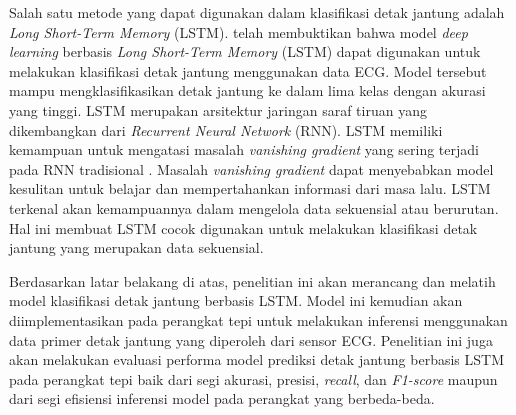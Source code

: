 

Salah satu metode yang dapat digunakan dalam klasifikasi detak jantung adalah \textit{Long Short-Term Memory} (LSTM).
\textcite{shchetininArrhythmiaDetectionUsing2022} telah membuktikan bahwa model \textit{deep learning} berbasis \emph{Long Short-Term Memory} (LSTM) dapat digunakan untuk melakukan klasifikasi detak jantung menggunakan data ECG.
Model tersebut mampu mengklasifikasikan detak jantung ke dalam lima kelas dengan akurasi yang tinggi.
LSTM merupakan arsitektur jaringan saraf tiruan yang dikembangkan dari \emph{Recurrent Neural Network} (RNN).
LSTM memiliki kemampuan untuk mengatasi masalah \textit{vanishing gradient} yang sering terjadi pada RNN tradisional \parencite{hochreiterLongShorttermMemory1997}.
Masalah \textit{vanishing gradient} dapat menyebabkan model kesulitan untuk belajar dan mempertahankan informasi dari masa lalu.
LSTM terkenal akan kemampuannya dalam mengelola data sekuensial atau berurutan.
Hal ini membuat LSTM cocok digunakan untuk melakukan klasifikasi detak jantung yang merupakan data sekuensial.



Berdasarkan latar belakang di atas, penelitian ini akan merancang dan melatih model klasifikasi detak jantung berbasis LSTM.
Model ini kemudian akan diimplementasikan pada perangkat tepi untuk melakukan inferensi menggunakan data primer detak jantung yang diperoleh dari sensor ECG.
Penelitian ini juga akan melakukan evaluasi performa model prediksi detak jantung berbasis LSTM pada perangkat tepi baik dari segi akurasi, presisi, \emph{recall}, dan \emph{F1-score} maupun dari segi efisiensi inferensi model pada perangkat yang berbeda-beda.





